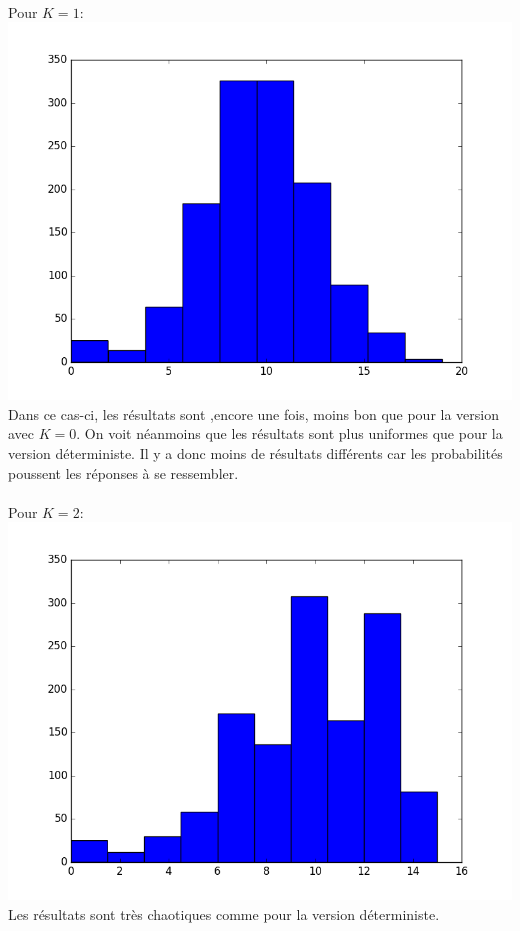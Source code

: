 \documentclass[a4paper, 11pt]{article}
\begin{document}
\paragraph{}
Pour $K=1$:\\
\includegraphics[scale=0.5]{d_p_1}
\\
Dans ce cas-ci, les résultats sont ,encore une fois, moins bon que pour la version avec $K=0$. On voit néanmoins que les résultats sont 
plus uniformes que pour la version déterministe. Il y a donc moins de résultats différents car les probabilités poussent les réponses à
se ressembler.

\paragraph{}
Pour $K=2$:\\
\includegraphics[scale=0.5]{d_p_2}
\\
Les résultats sont très chaotiques comme pour la version déterministe.
\end{document}
